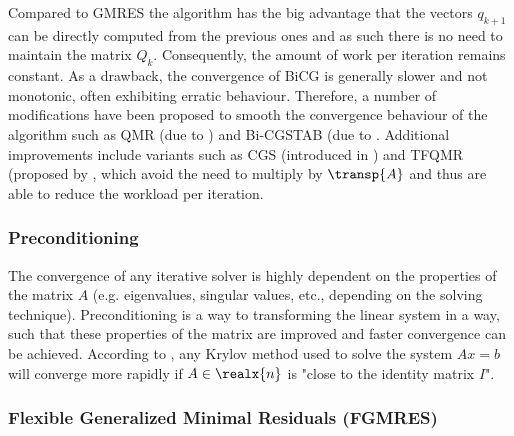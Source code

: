 Compared to GMRES the algorithm has the big advantage that the vectors $q_{k+1}$ can be directly computed from the previous ones and as such there is no need to maintain the matrix $Q_k$. Consequently, the amount of work per iteration remains constant. As a drawback, the convergence of BiCG is generally slower and not monotonic, often exhibiting erratic behaviour. Therefore, a number of modifications have been proposed to smooth the convergence behaviour of the algorithm such as QMR (due to \cite{freund_qmr_1991}) and Bi-CGSTAB (due to \cite{van_der_vorst_bi-cgstab_1992}. Additional improvements include variants such as CGS (introduced in \cite{sonneveld_cgs_1989}) and TFQMR (proposed by \cite{freund_transpose-free_1994}, which avoid the need to multiply by $\transp{A}$ and thus are able to reduce the workload per iteration.

\subsubsection{Preconditioning}
\label{sec:preconditioning}
The convergence of any iterative solver is highly dependent on the properties of the matrix $A$ (e.g. eigenvalues, singular values, etc., depending on the solving technique). Preconditioning is a way to transforming the linear system in a way, such that these properties of the matrix are improved and faster convergence can be achieved. According to \cite{golub_matrix_2013}, any Krylov method used to solve the system $Ax=b$ will converge more rapidly if $A \in \realx{n}$ is "close to the identity matrix $I$". 




\subsubsection{Flexible Generalized Minimal Residuals (FGMRES)}
\label{sec:fgmres}